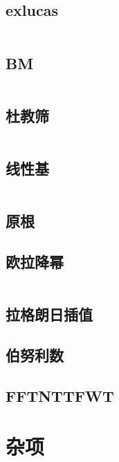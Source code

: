 \documentclass[a4paper,11pt]{article}
\begin{document}
    \subsection{exlucas}
    \inputminted[breaklines]{c++}{Math/exlucas.cpp}

    \subsection{BM}
    \inputminted[breaklines]{c++}{Math/BM.cpp}

    \subsection{杜教筛}
    \inputminted[breaklines]{c++}{Math/杜教筛.cpp}

    \subsection{线性基}
    \inputminted[breaklines]{c++}{Math/线性基.cpp}

    \subsection{原根}
    

    \subsection{欧拉降幂}
    \inputminted[breaklines]{c++}{Math/欧拉降幂.cpp}

    \subsection{拉格朗日插值}
    

    \subsection{伯努利数}
    

    \subsection{FFTNTTFWT}
    


    \newpage
    \section{杂项}
\end{document}
